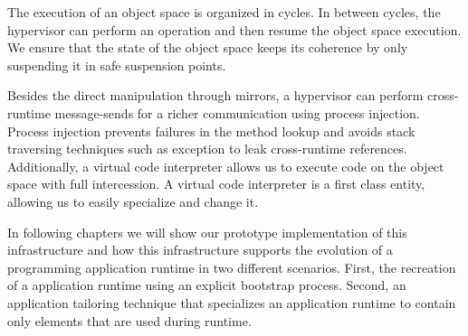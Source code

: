 The execution of an object space is organized in cycles. In between cycles, the hypervisor can perform an operation and then resume the object space execution. We ensure that the state of the object space keeps its coherence by only suspending it in safe suspension points.

Besides the direct manipulation through mirrors, a hypervisor can perform cross-runtime message-sends for a richer communication using process injection. Process injection prevents failures in the method lookup and avoids stack traversing techniques such as exception to leak cross-runtime references. Additionally, a virtual code interpreter allows us to execute code on the object space with full intercession. A virtual code interpreter is a first class entity, allowing us to easily specialize and change it.

In following chapters we will show our prototype implementation of this infrastructure and how this infrastructure supports the evolution of a programming application runtime in two different scenarios. First, the recreation of a application runtime using an explicit bootstrap process. Second, an application tailoring technique that specializes an application runtime to contain only elements that are used during runtime.

